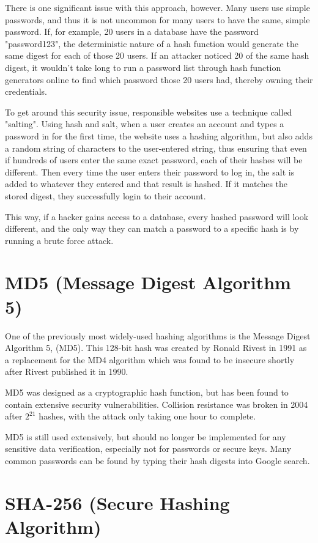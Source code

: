 \documentclass{article}
\begin{document}
There is one significant issue with this approach, however. Many users use simple passwords, and thus it is not uncommon for many users to have the same, simple password. If, for example, 20 users in a database have the password "password123", the deterministic nature of a hash function would generate the same digest for each of those 20 users. If an attacker noticed 20 of the same hash digest, it wouldn't take long to run a password list through hash function generators online to find which password those 20 users had, thereby owning their credentials. 

To get around this security issue, responsible websites use a technique called "salting". Using hash and salt, when a user creates an account and types a password in for the first time, the website uses a hashing algorithm, but also adds a random string of characters to the user-entered string, thus ensuring that even if hundreds of users enter the same exact password, each of their hashes will be different. Then every time the user enters their password to log in, the salt is added to whatever they entered and that result is hashed. If it matches the stored digest, they successfully login to their account. 

This way, if a hacker gains access to a database, every hashed password will look different, and the only way they can match a password to a specific hash is by running a brute force attack. 


\section{MD5 (Message Digest Algorithm 5)}
\tab One of the previously most widely-used hashing algorithms is the Message Digest Algorithm 5, (MD5). This 128-bit hash was created by Ronald Rivest in 1991 as a replacement for the MD4 algorithm which was found to be insecure shortly after Rivest published it in 1990. 

MD5 was designed as a cryptographic hash function, but has been found to contain extensive security vulnerabilities. Collision resistance was broken in 2004 after $2^{21}$ hashes, with the attack only taking one hour to complete. 

MD5 is still used extensively, but should no longer be implemented for any sensitive data verification, especially not for passwords or secure keys. Many common passwords can be found by typing their hash digests into Google search.


\section{SHA-256 (Secure Hashing Algorithm)}
\end{document}
